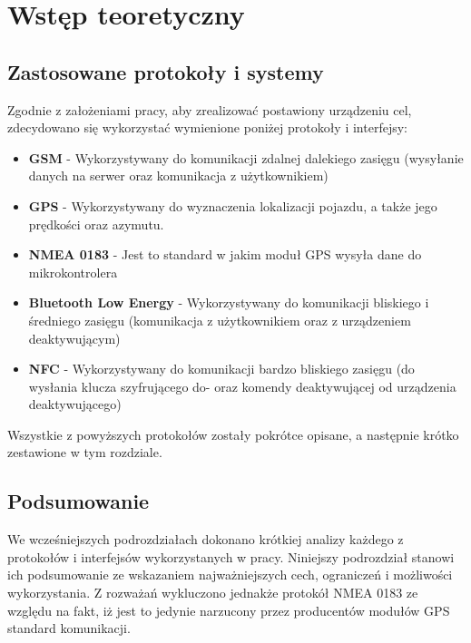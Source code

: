 \chapter{Wstęp teoretyczny}
\label{teorethical_introduction}

\section{Zastosowane protokoły i systemy}
Zgodnie z założeniami pracy, aby zrealizować postawiony urządzeniu cel, zdecydowano się wykorzystać wymienione poniżej protokoły i interfejsy:
\begin{itemize}
	\item \textbf{GSM} - Wykorzystywany do komunikacji zdalnej dalekiego zasięgu (wysyłanie danych na serwer oraz komunikacja z użytkownikiem)
	\item \textbf{GPS} - Wykorzystywany do wyznaczenia lokalizacji pojazdu, a także jego prędkości oraz azymutu.
	
	\item \textbf{NMEA 0183} - Jest to standard w jakim moduł GPS wysyła dane do mikrokontrolera
	\item \textbf{Bluetooth Low Energy} - Wykorzystywany do komunikacji bliskiego i średniego zasięgu (komunikacja z użytkownikiem oraz z urządzeniem deaktywującym)
	\item \textbf{NFC} - Wykorzystywany do komunikacji bardzo bliskiego zasięgu (do wysłania klucza szyfrującego do- oraz komendy deaktywującej od urządzenia deaktywującego)
\end{itemize}

Wszystkie z powyższych protokołów zostały pokrótce opisane, a następnie krótko zestawione w tym rozdziale.

\clearpage











\clearpage
\section{Podsumowanie}

We wcześniejszych podrozdziałach dokonano krótkiej analizy każdego z protokołów i interfejsów wykorzystanych w pracy. Niniejszy podrozdział stanowi ich podsumowanie ze wskazaniem najważniejszych cech, ograniczeń i możliwości wykorzystania. Z rozważań wykluczono jednakże protokół NMEA 0183 ze względu na fakt, iż jest to jedynie narzucony przez producentów modułów GPS standard komunikacji.

